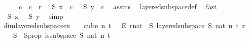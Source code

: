 \begin{isabellebody}
\ \ \isamarkupfalse%
\ \isamarkupfalse%
\ c\ \ {\isachardoublequoteopen}c\ {\isacharless}{\kern0pt}\ r\ {\isasymand}\ {\isasymchi}\ {\isacharparenleft}{\kern0pt}S\ x{\isacharparenright}{\kern0pt}\ {\isacharequal}{\kern0pt}\ c\ {\isasymand}\ {\isasymchi}\ {\isacharparenleft}{\kern0pt}S\ y{\isacharparenright}{\kern0pt}\ {\isacharequal}{\kern0pt}\ c{\isachardoublequoteclose}\ \isamarkupfalse%
\ assms\ \isamarkupfalse%
\ layered{\isacharunderscore}{\kern0pt}subspace{\isacharunderscore}{\kern0pt}def\ \isamarkupfalse%
\ fast\isanewline
\ \ \isamarkupfalse%
\ \isamarkupfalse%
\ {\isachardoublequoteopen}{\isasymchi}\ {\isacharparenleft}{\kern0pt}S\ x{\isacharparenright}{\kern0pt}\ {\isacharequal}{\kern0pt}\ {\isasymchi}\ {\isacharparenleft}{\kern0pt}S\ y{\isacharparenright}{\kern0pt}{\isachardoublequoteclose}\ \isamarkupfalse%
\ simp\isanewline
{}\isamarkupfalse%
%
\endisatagproof
{\isafoldproof}%
%
\isadelimproof
\isanewline
%
\endisadelimproof
\isanewline
{}\isamarkupfalse%
\ dim{}{\isacharunderscore}{\kern0pt}layered{\isacharunderscore}{\kern0pt}subspace{\isacharunderscore}{\kern0pt}ex{\isacharcolon}{\kern0pt}\ \ {\isachardoublequoteopen}{\isasymchi}\ {\isasymin}\ {\isacharparenleft}{\kern0pt}cube\ n\ {\isacharparenleft}{\kern0pt}t\ {\isacharplus}{\kern0pt}\ {}{\isacharparenright}{\kern0pt}{\isacharparenright}{\kern0pt}\ {\isasymrightarrow}\isactrlsub E\ {\isacharbraceleft}{\kern0pt}{\isachardot}{\kern0pt}{\isachardot}{\kern0pt}{\isacharless}{\kern0pt}r{\isacharcolon}{\kern0pt}{\isacharcolon}{\kern0pt}nat{\isacharbraceright}{\kern0pt}{\isachardoublequoteclose}\ \ {\isachardoublequoteopen}{\isasymexists}S{\isachardot}{\kern0pt}\ layered{\isacharunderscore}{\kern0pt}subspace\ S\ {\isacharparenleft}{\kern0pt}{}{\isacharcolon}{\kern0pt}{\isacharcolon}{\kern0pt}nat{\isacharparenright}{\kern0pt}\ n\ t\ r\ {\isasymchi}{\isachardoublequoteclose}\isanewline
%
\isadelimproof
%
\endisadelimproof
%
\isatagproof
{}\isamarkupfalse%
{\isacharminus}{\kern0pt}\isanewline
\ \ \isamarkupfalse%
\ S\ \ S{\isacharunderscore}{\kern0pt}prop{\isacharcolon}{\kern0pt}\ {\isachardoublequoteopen}is{\isacharunderscore}{\kern0pt}subspace\ S\ {\isacharparenleft}{\kern0pt}{}{\isacharcolon}{\kern0pt}{\isacharcolon}{\kern0pt}nat{\isacharparenright}{\kern0pt}\ n\ {\isacharparenleft}{\kern0pt}t{\isacharplus}{\kern0pt}{}{\isacharparenright}{\kern0pt}{\isachardoublequoteclose}\ \isamarkupfalse%

\end{isabellebody}
